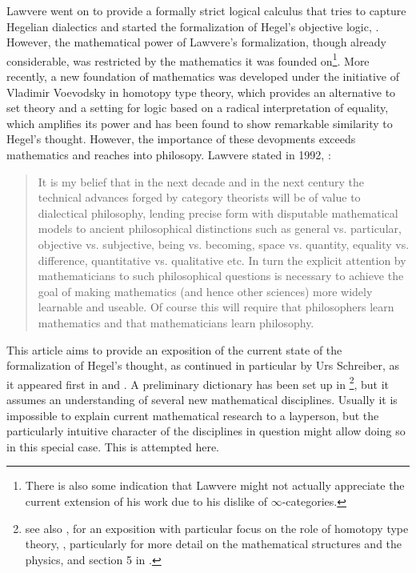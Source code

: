 \documentclass{article}
\begin{document}
Lawvere went on to provide a formally strict logical calculus that tries to capture Hegelian dialectics
and started the formalization of Hegel's objective logic, \cite{Law91}. However, the mathematical power
of Lawvere's formalization, though already considerable, was restricted by the mathematics it was founded
on\footnote{There is also some indication that Lawvere might not actually appreciate the current extension
of his work due to his dislike of $\infty$-categories.}. More recently, a new foundation of mathematics
was developed under the initiative of Vladimir Voevodsky in homotopy type theory, which provides an alternative
to set theory and a setting for logic based on a radical interpretation of equality, which amplifies its
power and has been found to show remarkable similarity to Hegel's thought. However, the importance of
these devopments exceeds mathematics and reaches into philosopy. Lawvere stated in 1992, \cite{Lawvere92}:


\begin{quote}
It is my belief that in the next decade and in the next century the technical advances forged by category
theorists will be of value to dialectical philosophy, lending precise form with disputable mathematical
models to ancient philosophical distinctions such as general vs. particular, objective vs. subjective,
being vs. becoming, space vs. quantity, equality vs. difference, quantitative vs. qualitative etc. In
turn the explicit attention by mathematicians to such philosophical questions is necessary to achieve
the goal of making mathematics (and hence other sciences) more widely learnable and useable. Of course
this will require that philosophers learn mathematics and that mathematicians learn philosophy.    
\end{quote}

This article aims to provide an exposition of the current state of the formalization of Hegel's thought,
as continued in particular by Urs Schreiber, as it appeared first in \cite{SQuant} and \cite{SSOrb}. A
preliminary dictionary has been set up in \cite{nlabsol} \footnote{see also \cite{Stalk}, \cite{SSh} for
an exposition with particular focus on the role of homotopy type theory, \cite{dcct}, particularly for
more detail on the mathematical structures and the physics, and section 5 in \cite{Cor}.}, but it assumes
an understanding of several new mathematical disciplines. Usually it is impossible to explain current
mathematical research to a layperson, but the particularly intuitive character of the disciplines in question
might allow doing so in this special case. This is attempted here.
\end{document}

